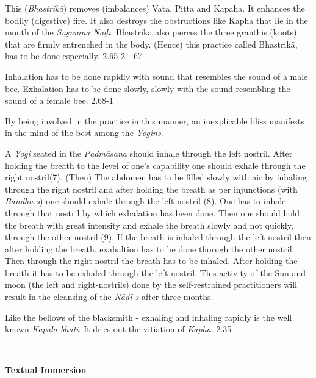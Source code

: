 
This (\textit{Bhastrikā}) removes (imbalances) Vata, Pitta and Kapaha. It enhances the bodily (digestive) fire. It also destroys the obstructions like Kapha that lie in the mouth of the \textit{Suṣumnā Nāḍī}. Bhastrikā also pierces the three granthis (knots) that are firmly entrenched in the body. (Hence) this practice called Bhastrikā, has to be done especially. 2.65-2 - 67


Inhalation has to be done rapidly with sound that resembles the sound of a male bee. Exhalation has to be done slowly, slowly with the sound resembling the sound of a female bee. 2.68-1


By being involved in the practice in this manner, an inexplicable bliss manifests in the mind of the best among the \textit{Yogins}.


A \textit{Yogi} seated in the \textit{Padmāsana} should inhale through the left nostril. After holding the breath to the level of one’s capability one should exhale through the right nostril(7). (Then) The abdomen has to be filled slowly with air by inhaling through the right nostril and after holding the breath as per injunctions (with \textit{Bandha-s}) one should exhale through the left nostril (8). One has to inhale through that nostril by which exhalation has been done. Then one should hold the breath with great intensity and exhale the breath slowly and not quickly, through the other nostril (9).  If the breath is inhaled through the left nostril then after holding the breath, exahaltion has to be done thorugh the other nostril. Then through the right nostril the breath has to be inhaled. After holding the breath it has to be exhaled through the left nostril. This activity of the Sun and moon (the left and right-nostrils) done by the self-restrained practitioners will result in the cleansing of the \textit{Nāḍī-s} after three months. 


Like the bellows of the blacksmith - exhaling and inhaling rapidly is the well known \textit{Kapāla-bhāti}. It dries out the vitiation of \textit{Kapha}. 2.35
\newpage

\thispagestyle{empty}
~
\vfill
\begin{center}
\textbf{\Huge Textual Immersion}
\end{center}
\vfill
\eject

